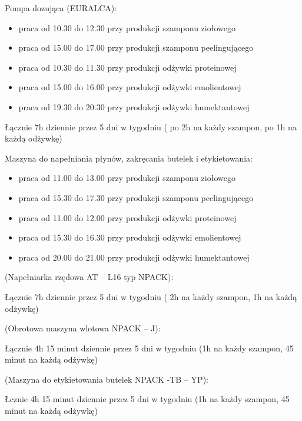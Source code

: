Pompa dozująca (\textsf{EURALCA}):
\begin{itemize}
\item praca od 10.30 do 12.30 przy produkcji szamponu ziołowego
\item praca od 15.00 do 17.00 przy produkcji szamponu peelingującego
\item praca od 10.30 do 11.30 przy produkcji odżywki proteinowej
\item praca od 15.00 do 16.00 przy produkcji odżywki emolientowej
\item praca od 19.30 do 20.30 przy produkcji odżywki humektantowej
\end{itemize}
Łącznie 7h dziennie przez 5 dni w tygodniu ( po 2h na każdy szampon, po 1h na każdą odżywkę)\vspace{\baselineskip}

Maszyna do napełniania płynów, zakręcania butelek i etykietowania:
\begin{itemize}
\item praca od 11.00 do 13.00 przy produkcji szamponu ziołowego
\item praca od 15.30 do 17.30 przy produkcji szamponu peelingującego
\item praca od 11.00 do 12.00 przy produkcji odżywki proteinowej
\item praca od 15.30 do 16.30 przy produkcji odżywki emolientowej
\item praca od 20.00 do 21.00 przy produkcji odżywki humektantowej
\end{itemize}\vspace{\baselineskip}

(Napełniarka rzędowa AT – L16 typ NPACK):

Łącznie 7h dziennie przez 5 dni w tygodniu ( 2h na każdy szampon, 1h na każdą odżywkę)\vspace{\baselineskip}

(Obrotowa maszyna wlotowa NPACK – J):

Łącznie 4h 15 minut dziennie przez 5 dni w tygodniu  (1h na każdy szampon, 45 minut na każdą odżywkę)\vspace{\baselineskip}

(Maszyna do etykietowania butelek NPACK -TB – YP):

Łcznie 4h 15 minut dziennie przez 5 dni w tygodniu  (1h na każdy szampon, 45 minut na każdą odżywkę)\vspace{\baselineskip}

